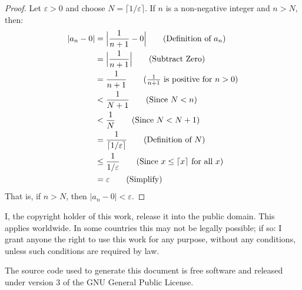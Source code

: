 \documentclass{article}
\theoremstyle{normal}
\theoremstyle{plain}
\newcommand{\ceil}[2][]{#1\lceil#2#1\rceil}
\begin{document}
    \begin{proof}
        Let $\varepsilon>0$ and choose $N=\ceil{1/\varepsilon}$. If $n$ is a
        non-negative integer and $n>N$, then:
        \begin{align}
            |a_{n}-0|&=\Big|\frac{1}{n+1}-0\Big|\tag{Definition of $a_{n}$}\\
                &=\Big|\frac{1}{n+1}\Big|\tag{Subtract Zero}\\
                &=\frac{1}{n+1}\tag{$\frac{1}{n+1}$ is positive for $n>0$}\\
                &<\frac{1}{N+1}\tag{Since $N<n$}\\
                &<\frac{1}{N}\tag{Since $N<N+1$}\\
                &=\frac{1}{\ceil{1/\varepsilon}}\tag{Definition of $N$}\\
                &\leq\frac{1}{1/\varepsilon}
                    \tag{Since $x\leq\ceil{x}$ for all $x$}\\
                &=\varepsilon\tag{Simplify}
        \end{align}
        That is, if $n>N$, then $|a_{n}-0|<\varepsilon$.
    \end{proof}
    \newpage
    I, the copyright holder of this work, release it into the public domain.
    This applies worldwide. In some countries this may not be legally possible;
    if so: I grant anyone the right to use this work for any purpose, without
    any conditions, unless such conditions are required by law.
    \par\hfill\par
    The source code used to generate this document is free software and released
    under version 3 of the GNU General Public License.
\end{document}
